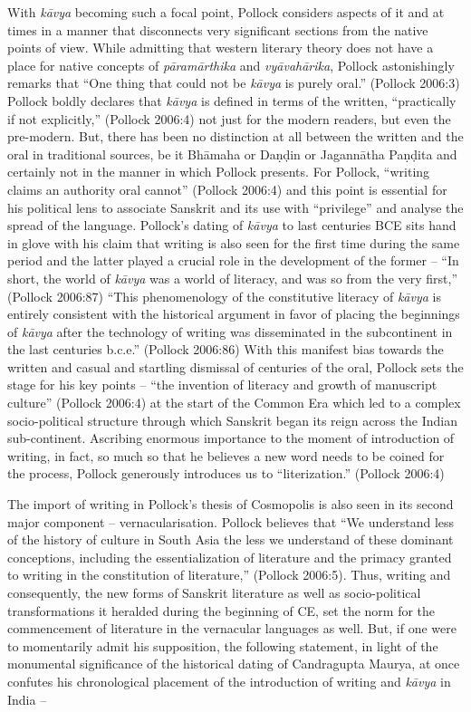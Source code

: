 With \textit{kāvya} becoming such a focal point, Pollock considers aspects of it and at times in a manner that disconnects very significant sections from the native points of view. While admitting that western literary theory does not have a place for native concepts of \textit{pāramārthika} and \textit{vyāvahārika}, Pollock astonishingly remarks that “One thing that could not be \textit{kāvya} is purely oral.” (Pollock 2006:3) Pollock boldly declares that \textit{kāvya} is defined in terms of the written, “practically if not explicitly,” (Pollock 2006:4) not just for the modern readers, but even the pre-modern. But, there has been no distinction at all between the written and the oral in traditional sources, be it Bhāmaha or Daṇḍin or Jagannātha Paṇḍita and certainly not in the manner in which Pollock presents. For Pollock, “writing claims an authority oral cannot” (Pollock 2006:4) and this point is essential for his political lens to associate Sanskrit and its use with “privilege” and analyse the spread of the language. Pollock’s dating of \textit{kāvya} to last centuries BCE sits hand in glove with his claim that writing is also seen for the first time during the same period and the latter played a crucial role in the development of the former – “In short, the world of \textit{kāvya} was a world of literacy, and was so from the very first,” (Pollock 2006:87) “This phenomenology of the constitutive literacy of \textit{kāvya} is entirely consistent with the historical argument in favor of placing the beginnings of \textit{kāvya} after the technology of writing was disseminated in the subcontinent in the last centuries b.c.e.” (Pollock 2006:86) With this manifest bias towards the written and casual and startling dismissal of centuries of the oral, Pollock sets the stage for his key points – “the invention of literacy and growth of manuscript culture” (Pollock 2006:4) at the start of the Common Era which led to a complex socio-political structure through which Sanskrit began its reign across the Indian sub-continent. Ascribing enormous importance to the moment of introduction of writing, in fact, so much so that he believes a new word needs to be coined for the process, Pollock generously introduces us to “literization.” (Pollock 2006:4)

The import of writing in Pollock’s thesis of Cosmopolis is also seen in its second major component – vernacularisation. Pollock believes that “We understand less of the history of culture in South Asia the less we understand of these dominant conceptions, including the essentialization of literature and the primacy granted to writing in the constitution of literature,” (Pollock 2006:5). Thus, writing and consequently, the new forms of Sanskrit literature as well as socio-political transformations it heralded during the beginning of CE, set the norm for the commencement of literature in the vernacular languages as well. But, if one were to momentarily admit his supposition, the following statement, in light of the monumental significance of the historical dating of Candragupta Maurya, at once confutes his chronological placement of the introduction of writing and \textit{kāvya} in India –

